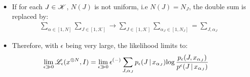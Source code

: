 \begin{frame} [t]
\begin{itemize}
{\begin{align*}
            \\ & = 
                \lim _{\epsilon \gg 0}
                \epsilon ^{(-)}
                \sum _{\alpha \in [1, N]}
                \sum _{J \in [1, \mathscr{K}]}
                  p _{\epsilon}
                    \conditional {J} 
                     {x _{\alpha}}
                \varlog  
                \frac 
                { p _{\epsilon} 
                  (J, x _{\alpha})
                } 
                { p ^{\epsilon} 
                  \conditional 
                   {J} {x _{\alpha}}
                }
            \end{align*}
            }
        \item 
            If for each $J \in \mathscr {K}$, 
            $N (J)$ is not uniform, i.e 
            $N (J) = N _{J}$, the double sum 
            is replaced by:
            { \footnotesize
            \begin{align*}
                \sum _{\alpha \in [1, N]}
                \sum _{J \in [1, \mathscr{K}]}
               \rightarrow 
                \sum _{J \in [1, \mathscr{K}]}
                \sum 
                 _{\alpha _{J} 
                   \in [1, N _{J}]
                  } 
                = 
                \sum _{J, \alpha _{J}} 
            \end{align*}
            } 
        \item Therefore, 
            with $\epsilon$ being very large, 
            the likelihood limits to:
            { \footnotesize 
            \begin{align*}
              \lim _{\epsilon \gg 0}
                \mathscr {L} _{\epsilon} 
                 (x ^{\otimes N}, I) 
            & = 
                \lim _{\epsilon \gg 0}
                \epsilon ^{(-)}
                \sum _{J, \alpha _{J}} 
                  p _{\epsilon}
                    ( J \,\vert\, x _{\alpha _{J}} )
                \textnormal{log}\,  
                \frac 
                { p _{\epsilon} 
                  (J, x _{\alpha _{J}})
                } 
                { p ^{\epsilon} 
                  ( J \,\vert\, x _{\alpha _{J}} )
                }
            \end{align*}
            }
\end{itemize}    
\end{frame}


